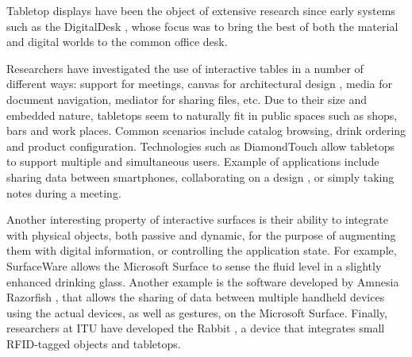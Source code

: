Tabletop displays have been the object of extensive research since early systems such as the DigitalDesk \citep{Wellner:1993:digitaldesk}, whose focus was to bring the best of both the material and digital worlds to the common office desk.


%
%

Researchers have investigated the use of interactive tables in a number of different ways: support for meetings, canvas for architectural design \cite{Clifton:2010:sketchtop}, media for document navigation, mediator for sharing files, etc.
Due to their size and embedded nature, tabletops seem to naturally fit in public spaces such as shops, bars and work places.
Common scenarios include catalog browsing, drink ordering and product configuration.
Technologies such as DiamondTouch \cite{Dietz:2001:diamondtouch} allow tabletops to support multiple and simultaneous users. Example of applications include sharing data between smartphones, collaborating on a design \cite{Hunter:2011:memtable}, or simply taking notes during a meeting.

Another interesting property of interactive surfaces is their ability to integrate with physical objects, both passive and dynamic, for the purpose of augmenting them with digital information, or controlling the application state.
For example, SurfaceWare \cite{Dietz:2009:surfaceware} allows the Microsoft Surface to sense the fluid level in a slightly enhanced drinking glass.
Another example is the software developed by Amnesia Razorfish \cite{amnesia}, that allows the sharing of data between multiple handheld devices using the actual devices, as well as gestures, on the Microsoft Surface.
Finally, researchers at ITU have developed the Rabbit \cite{rabbit}, a device that integrates small RFID-tagged objects and tabletops.



